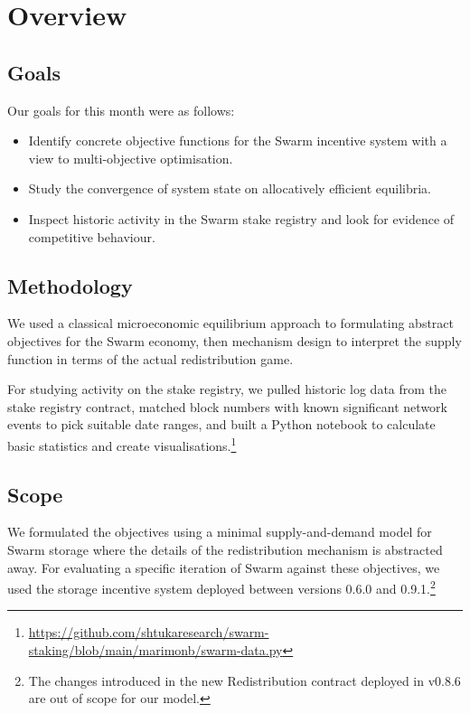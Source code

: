 \maketitle
\section*{Overview}

\subsection*{Goals}

Our goals for this month were as follows: 

\begin{itemize}
  \item 
    Identify concrete objective functions for the Swarm incentive system with a view to multi-objective optimisation.
  \item
    Study the convergence of system state on allocatively efficient equilibria.
  \item
    Inspect historic activity in the Swarm stake registry and look for evidence of competitive behaviour.
\end{itemize}

\subsection*{Methodology}

We used a classical microeconomic equilibrium approach to formulating abstract objectives for the Swarm economy, then mechanism design to interpret the supply function in terms of the actual redistribution game.

For studying activity on the stake registry, we pulled historic log data from the stake registry contract, matched block numbers with known significant network events to pick suitable date ranges, and built a Python notebook to calculate basic statistics and create visualisations.\footnote{\url{https://github.com/shtukaresearch/swarm-staking/blob/main/marimonb/swarm-data.py}}

\subsection*{Scope}

We formulated the objectives using a minimal supply-and-demand model for Swarm storage where the details of the redistribution mechanism is abstracted away.
%
For evaluating a specific iteration of Swarm against these objectives, we used the storage incentive system deployed between versions 0.6.0 and 0.9.1.\footnote{The changes introduced in the new Redistribution contract deployed in v0.8.6 are out of scope for our model.}

